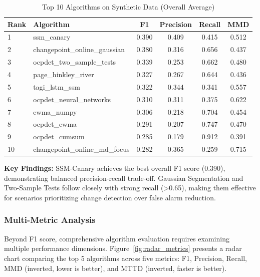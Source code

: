 \begin{table}[H]
\centering
\caption{Top 10 Algorithms on Synthetic Data (Overall Average)}
\label{tab:synthetic_overall}
\small
\begin{tabular}{llcccc}
\toprule
\textbf{Rank} & \textbf{Algorithm} & \textbf{F1} & \textbf{Precision} & \textbf{Recall} & \textbf{MMD} \\
\midrule
1 & ssm\_canary & 0.390 & 0.409 & 0.415 & 0.512 \\
2 & changepoint\_online\_gaussian & 0.380 & 0.316 & 0.656 & 0.437 \\
3 & ocpdet\_two\_sample\_tests & 0.339 & 0.253 & 0.662 & 0.480 \\
4 & page\_hinkley\_river & 0.327 & 0.267 & 0.644 & 0.436 \\
5 & tagi\_lstm\_ssm & 0.322 & 0.344 & 0.341 & 0.557 \\
6 & ocpdet\_neural\_networks & 0.310 & 0.311 & 0.375 & 0.622 \\
7 & ewma\_numpy & 0.306 & 0.218 & 0.704 & 0.454 \\
8 & ocpdet\_ewma & 0.291 & 0.207 & 0.747 & 0.470 \\
9 & ocpdet\_cumsum & 0.285 & 0.179 & 0.912 & 0.391 \\
10 & changepoint\_online\_md\_focus & 0.282 & 0.365 & 0.259 & 0.715 \\
\bottomrule
\end{tabular}
\end{table}

\textbf{Key Findings:} SSM-Canary achieves the best overall F1 score (0.390), demonstrating balanced precision-recall trade-off. Gaussian Segmentation and Two-Sample Tests follow closely with strong recall (>0.65), making them effective for scenarios prioritizing change detection over false alarm reduction.


\subsubsection{Multi-Metric Analysis}

Beyond F1 score, comprehensive algorithm evaluation requires examining multiple performance dimensions. Figure~\ref{fig:radar_metrics} presents a radar chart comparing the top 5 algorithms across five metrics: F1, Precision, Recall, MMD (inverted, lower is better), and MTTD (inverted, faster is better).

